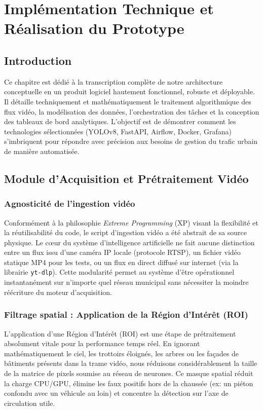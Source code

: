 \chapter{Implémentation Technique et Réalisation du Prototype}

\section{Introduction}
Ce chapitre est dédié à la transcription complète de notre architecture conceptuelle en un produit logiciel hautement fonctionnel, robuste et déployable. Il détaille techniquement et mathématiquement le traitement algorithmique des flux vidéo, la modélisation des données, l'orchestration des tâches et la conception des tableaux de bord analytiques. L'objectif est de démontrer comment les technologies sélectionnées (YOLOv8, FastAPI, Airflow, Docker, Grafana) s'imbriquent pour répondre avec précision aux besoins de gestion du trafic urbain de manière automatisée.

\section{Module d'Acquisition et Prétraitement Vidéo}

\subsection{Agnosticité de l'ingestion vidéo}
Conformément à la philosophie \textit{Extreme Programming} (XP) visant la flexibilité et la réutilisabilité du code, le script d'ingestion vidéo a été abstrait de sa source physique. Le cœur du système d'intelligence artificielle ne fait aucune distinction entre un flux issu d'une caméra IP locale (protocole RTSP), un fichier vidéo statique MP4 pour les tests, ou un flux en direct diffusé sur internet (via la librairie \texttt{yt-dlp}). Cette modularité permet au système d'être opérationnel instantanément sur n'importe quel réseau municipal sans nécessiter la moindre réécriture du moteur d'acquisition.

\subsection{Filtrage spatial : Application de la Région d'Intérêt (ROI)}
L'application d'une Région d'Intérêt (ROI) est une étape de prétraitement absolument vitale pour la performance temps réel. En ignorant mathématiquement le ciel, les trottoirs éloignés, les arbres ou les façades de bâtiments présents dans la trame vidéo, nous réduisons considérablement la taille de la matrice de pixels soumise au réseau de neurones. Ce masque spatial réduit la charge CPU/GPU, élimine les faux positifs hors de la chaussée (ex: un piéton confondu avec un véhicule au loin) et concentre la détection sur l'axe de circulation utile.

